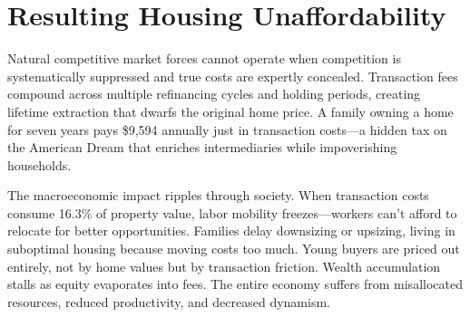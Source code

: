 \section{Resulting Housing Unaffordability}

Natural competitive market forces cannot operate when competition is systematically suppressed and true costs are expertly concealed. Transaction fees compound across multiple refinancing cycles and holding periods, creating lifetime extraction that dwarfs the original home price. A family owning a home for seven years pays \$9,594 annually just in transaction costs—a hidden tax on the American Dream that enriches intermediaries while impoverishing households.

The macroeconomic impact ripples through society. When transaction costs consume 16.3\% of property value, labor mobility freezes—workers can't afford to relocate for better opportunities. Families delay downsizing or upsizing, living in suboptimal housing because moving costs too much. Young buyers are priced out entirely, not by home values but by transaction friction. Wealth accumulation stalls as equity evaporates into fees. The entire economy suffers from misallocated resources, reduced productivity, and decreased dynamism.

